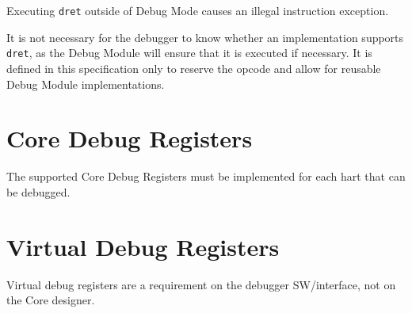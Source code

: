 Executing {\tt dret} outside of Debug Mode causes an illegal instruction exception.

It is not necessary for the debugger to know whether an implementation supports
{\tt dret}, as the Debug Module will ensure that it is executed if necessary.
It is defined in this specification only to reserve the opcode and
allow for reusable Debug Module implementations.

\section{Core Debug Registers} \label{debreg}

The supported Core Debug Registers must be implemented for each hart that can
be debugged.



\section{Virtual Debug Registers} \label{virtreg}

Virtual debug registers are a requirement on the debugger SW/interface,
not on the Core designer.


